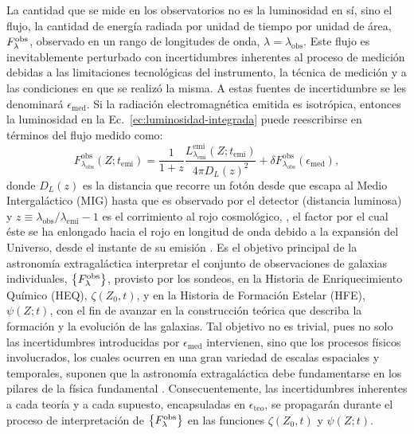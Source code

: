 La cantidad que se mide en los observatorios no es la luminosidad en sí, sino el flujo, \ie la
cantidad de energía radiada por unidad de tiempo por unidad de área, $\sedt[F]{obs}$, observado en
un rango de longitudes de onda, $\lambda=\lambda_\text{obs}$. Este flujo es inevitablemente
perturbado con incertidumbres inherentes al proceso de medición debidas a las limitaciones
tecnológicas del instrumento, la técnica de medición y a las condiciones en que se realizó la misma.
A estas fuentes de incertidumbre se les denominará $\epsilon_\text{med}$. Si la radiación
electromagnética emitida es isotrópica, entonces la luminosidad en la
Ec.~\eqref{ec:luminosidad-integrada} puede reescribirse en términos del flujo medido como:
%
\begin{equation}\label{ec:flujo-integrado}
F_{\lambda_\text{obs}}^\text{obs}(Z;t_\text{emi}) = \frac{1}{1+z}\frac{L_{\lambda_\text{emi}}^\text{emi}(Z;t_\text{emi})}{4\pi D_L(z)^2} + \delta{F_{\lambda_\text{obs}}^\text{obs}}(\epsilon_\text{med}),
\end{equation}
%
donde $D_L(z)$ es la distancia que recorre un fotón desde que escapa al Medio Intergaláctico (MIG)
hasta que es observado por el detector (distancia luminosa) y
$z\equiv\lambda_\text{obs}/\lambda_\text{emi}-1$ es el corrimiento al rojo cosmológico, \ie, el
factor por el cual éste se ha enlongado hacia el rojo en longitud de onda debido a la expansión del
Universo, desde el instante de su emisión \citep{Hogg1999, Hogg2002}. Es el objetivo principal de la
astronomía extragaláctica interpretar el conjunto de observaciones de galaxias individuales,
$\set{\sedt[F]{obs}}$, provisto por los sondeos, en la Historia de Enriquecimiento Químico (HEQ),
$\zeta(Z_0,t)$, y en la Historia de Formación Estelar (HFE), $\psi(Z;t)$, con el fin de avanzar en
la construcción teórica que describa la formación y la evolución de las galaxias. Tal objetivo no es
trivial, pues no solo las incertidumbres introducidas por $\epsilon_\text{med}$ intervienen, sino
que los procesos físicos involucrados, los cuales ocurren en una gran variedad de escalas espaciales
y temporales, suponen que la astronomía extragaláctica debe fundamentarse en los pilares de la
física fundamental \citep[véase][para revisiones detalladas]{Somerville2015, Naab2017}.
Consecuentemente, las incertidumbres inherentes a cada teoría y a cada supuesto, encapsuladas en
$\epsilon_\text{teo}$, se propagarán durante el proceso de interpretación de $\set{\sedt[F]{obs}}$
en las funciones $\zeta(Z_0,t)$ y $\psi(Z;t)$.

